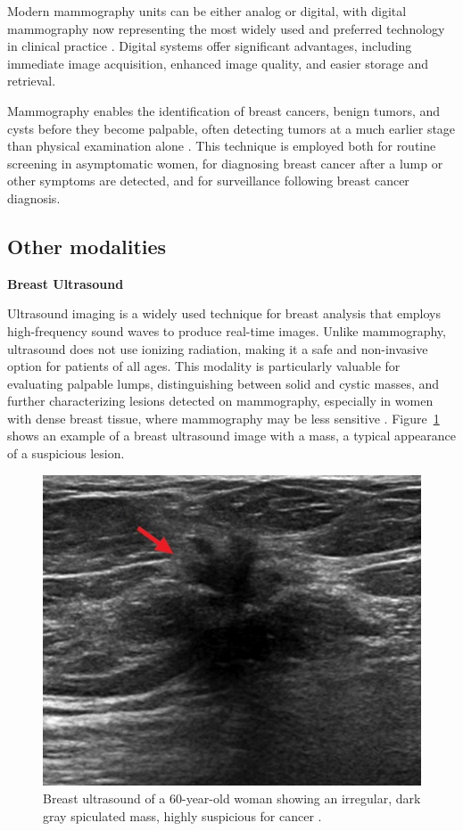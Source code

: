 \documentclass[a4paper,10pt]{book}
\begin{document}
Modern mammography units can be either analog or digital, with digital mammography now representing the most widely used and preferred technology in clinical practice \cite{ltd_mammography_2025, noauthor_mammography_nodate}. Digital systems offer significant advantages, including immediate image acquisition, enhanced image quality, and easier storage and retrieval.

Mammography enables the identification of breast cancers, benign tumors, and cysts before they become palpable, often detecting tumors at a much earlier stage than physical examination alone \cite{staff_what_2025}. This technique is employed both for routine screening in asymptomatic women, for diagnosing breast cancer after a lump or other symptoms are detected, and for surveillance following breast cancer diagnosis.

\subsection{Other modalities}

\textbf{Breast Ultrasound}

Ultrasound imaging is a widely used technique for breast analysis that employs high-frequency sound waves to produce real-time images. Unlike mammography, ultrasound does not use ionizing radiation, making it a safe and non-invasive option for patients of all ages. This modality is particularly valuable for evaluating palpable lumps, distinguishing between solid and cystic masses, and further characterizing lesions detected on mammography, especially in women with dense breast tissue, where mammography may be less sensitive \cite{gokhale_ultrasound_2009}. Figure~\ref{fig:breast_ultrasound} shows an example of a breast ultrasound image with a mass, a typical appearance of a suspicious lesion.


\begin{figure}
    \centering
    \includegraphics[width=0.5\linewidth]{reports//assets/ultrasound.jpg}
    \caption{Breast ultrasound of a 60-year-old woman showing an irregular, dark gray spiculated mass, highly suspicious for cancer \cite{noauthor_breast_nodate}.}
    \label{fig:breast_ultrasound}
\end{figure}
\end{document}
